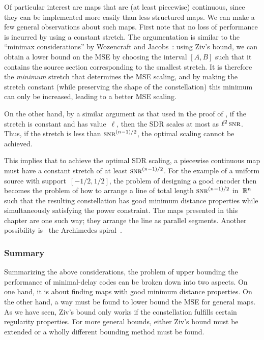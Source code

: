 Of particular interest are maps that are (at least piecewise) continuous, since
they can be implemented more easily than less structured maps. We can make a few
general observations about such maps. First note that no loss of performance is
incurred by using a constant stretch. The argumentation is similar to the
``minimax considerations'' by Wozencraft and
Jacobs~\cite[p.~620]{WozencraftJ1965}: using Ziv's bound, we can obtain a lower
bound on the MSE by choosing the interval $[A,B]$ such that it contains the
source section corresponding to the smallest stretch. It is therefore the
\emph{minimum} stretch that determines the MSE scaling, and by making the
stretch constant (while preserving the shape of the constellation) this minimum
can only be increased, leading to a better MSE scaling.

On the other hand, by a similar argument as that used in the proof of
, if the stretch is constant and has value~$\ell$, then the
SDR scales at most as $\ell^2 \snr$. Thus, if the stretch is less than
$\snr^{(n-1)/2}$, the optimal scaling cannot be achieved. 

This implies that to achieve the optimal SDR scaling, a piecewise continuous map
must have a constant stretch of at least $\snr^{(n-1)/2}$. For the example of a
uniform source with support~$[-1/2, 1/2]$, the problem of designing a good
encoder then becomes the problem of how to arrange a line of total
length $\snr^{(n-1)/2}$ in~$\mathbb{R}^n$ such that the resulting constellation has good
minimum distance properties while simultaneously satisfying the power
constraint. The maps presented in this chapter are one such way; they arrange
the line as parallel segments. Another possibility is \eg\ the Archimedes
spiral~\cite{Ramstad2002}.


\subsubsection{Summary}

Summarizing the above considerations, the problem of upper bounding the
performance of minimal-delay codes can be broken down into two aspects. On one
hand, it is about finding maps with good minimum distance properties. On the
other hand, a way must be found to lower bound the MSE for general maps. As we
have seen, Ziv's bound only works if the constellation fulfills certain
regularity properties. For more general bounds, either Ziv's bound must be
extended or a wholly different bounding method must be found. 


